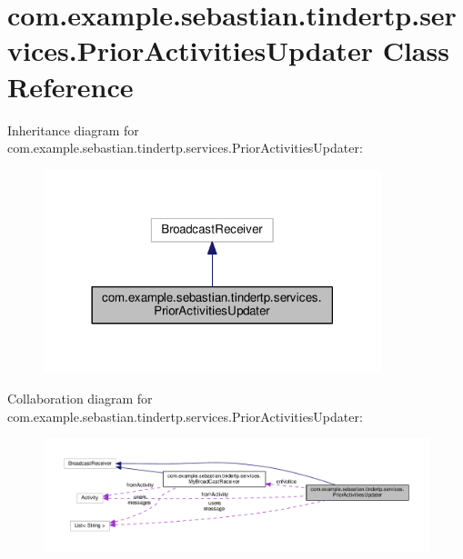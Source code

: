 \hypertarget{classcom_1_1example_1_1sebastian_1_1tindertp_1_1services_1_1PriorActivitiesUpdater}{}\section{com.\+example.\+sebastian.\+tindertp.\+services.\+Prior\+Activities\+Updater Class Reference}
\label{classcom_1_1example_1_1sebastian_1_1tindertp_1_1services_1_1PriorActivitiesUpdater}


Inheritance diagram for com.\+example.\+sebastian.\+tindertp.\+services.\+Prior\+Activities\+Updater\+:
\nopagebreak
\begin{figure}[H]
\begin{center}
\leavevmode
\includegraphics[width=278pt]{classcom_1_1example_1_1sebastian_1_1tindertp_1_1services_1_1PriorActivitiesUpdater__inherit__graph}
\end{center}
\end{figure}


Collaboration diagram for com.\+example.\+sebastian.\+tindertp.\+services.\+Prior\+Activities\+Updater\+:
\nopagebreak
\begin{figure}[H]
\begin{center}
\leavevmode
\includegraphics[width=350pt]{classcom_1_1example_1_1sebastian_1_1tindertp_1_1services_1_1PriorActivitiesUpdater__coll__graph}
\end{center}
\end{figure}
